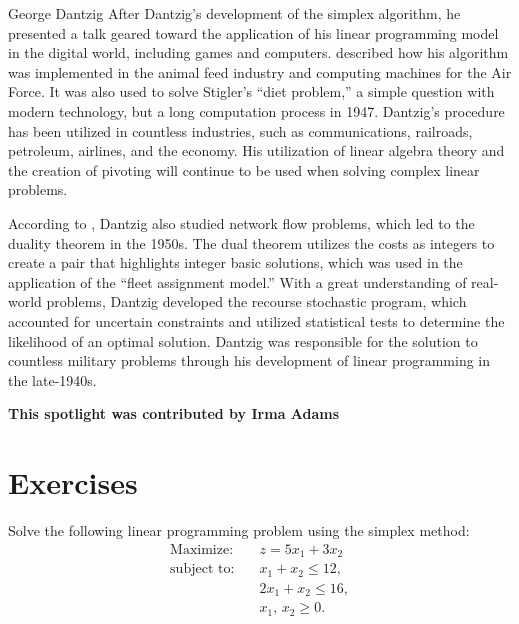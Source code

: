 \begin{refsection}
\begin{pioneerspotlight}{George Dantzig}
After Dantzig’s development of the simplex algorithm, he presented a talk geared toward the application of his linear programming model in the digital world, including games and computers. \textcite{cottle_2007_george} described how his algorithm was implemented in the animal feed industry and computing machines for the Air Force. It was also used to solve Stigler’s “diet problem,” a simple question with modern technology, but a long computation process in 1947. Dantzig’s procedure has been utilized in countless industries, such as communications, railroads, petroleum, airlines, and the economy. His utilization of linear algebra theory and the creation of pivoting will continue to be used when solving complex linear problems.

According to \textcite{cottle_2007_george}, Dantzig also studied network flow problems, which led to the duality theorem in the 1950s. The dual theorem utilizes the costs as integers to create a pair that highlights integer basic solutions, which was used in the application of the “fleet assignment model.” With a great understanding of real-world problems, Dantzig developed the recourse stochastic program, which accounted for uncertain constraints and utilized statistical tests to determine the likelihood of an optimal solution. Dantzig was responsible for the solution to countless military problems through his development of linear programming in the late-1940s. \\
\begin{center}
{\small \textbf{This spotlight was contributed by Irma Adams}}
\end{center}
\printbibliography[heading=subbibliography]
\end{pioneerspotlight}

\end{refsection}
\section{Exercises}

\begin{ex}{}
Solve the following linear programming problem using the simplex method:
\[
\begin{aligned}
\text{Maximize:}\quad & z = 5x_{1} + 3x_{2}\\
\text{subject to:}\quad & x_{1} + x_{2} \le 12,\\
& 2x_{1} + x_{2} \le 16,\\
& x_{1},\, x_{2} \ge 0.
\end{aligned}
\]
\end{ex}

